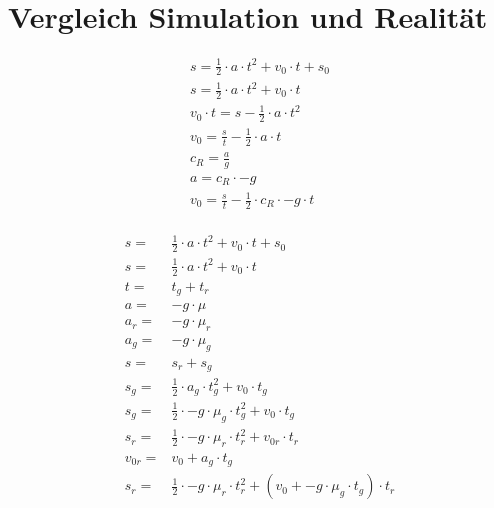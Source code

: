 \section{Vergleich Simulation und Realität}


\begin{multline}
    s = \frac{1}{2} \cdot a \cdot t^2 + v_0 \cdot t + s_0\\
    s = \frac{1}{2} \cdot a \cdot t^2 + v_0 \cdot t\\
    v_0 \cdot t = s - \frac{1}{2} \cdot a \cdot t^2\\
    v_0 = \frac{s}{t} - \frac{1}{2} \cdot a \cdot t\\
    c_R = \frac{a}{g}\\
    a = c_R \cdot -g\\
    v_0 = \frac{s}{t} - \frac{1}{2} \cdot c_R \cdot -g \cdot t\\
\end{multline}

\begin{equation}
\begin{aligned}
    s = & \frac{1}{2} \cdot a \cdot t^2 + v_0 \cdot t + s_0\\
    s = & \frac{1}{2} \cdot a \cdot t^2 + v_0 \cdot t\\
    t = & t_g + t_r\\
    a = & -g \cdot \mu\\
    a_r = & -g \cdot \mu_r\\
    a_g = & -g \cdot \mu_g\\
    s = & s_r + s_g\\
    s_g = & \frac{1}{2} \cdot a_g \cdot t_g^2 + v_0 \cdot t_g\\
    s_g = & \frac{1}{2} \cdot -g \cdot \mu_g \cdot t_g^2 + v_0 \cdot t_g\\
    s_r = & \frac{1}{2} \cdot -g \cdot \mu_r \cdot t_r^2 + v_{0r} \cdot t_r\\
    v_{0r} = & v_0 + a_g \cdot t_g\\
    s_r = & \frac{1}{2} \cdot -g \cdot \mu_r \cdot t_r^2 + (v_0 + -g \cdot \mu_g \cdot t_g) \cdot t_r
\end{aligned}
\end{equation}

